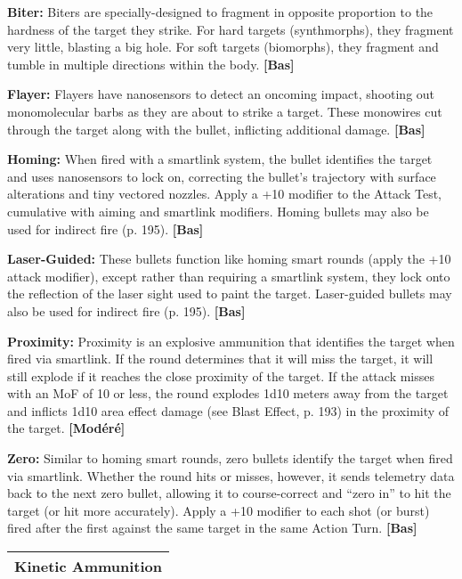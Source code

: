 {{\textbf{Biter:} Biters are specially-designed to fragment in opposite proportion to the hardness of the target they strike. For hard targets (synthmorphs), they fragment very little, blasting a big hole. For soft targets (biomorphs), they fragment and tumble in multiple directions within the body. \textbf{[Bas]} 

\textbf{Flayer:} Flayers have nanosensors to detect an oncoming impact, shooting out monomolecular barbs as they are about to strike a target. These monowires cut through the target along with the bullet, inflicting additional damage. \textbf{[Bas]} 

\textbf{Homing:} When fired with a smartlink system, the bullet identifies the target and uses nanosensors to lock on, correcting the bullet’s trajectory with surface alterations and tiny vectored nozzles. Apply a +10 modifier to the Attack Test, cumulative with aiming and smartlink modifiers. Homing bullets may also be used for indirect fire (p. 195). \textbf{[Bas]} 

\textbf{Laser-Guided:} These bullets function like homing smart rounds (apply the +10 attack modifier), except rather than requiring a smartlink system, they lock onto the reflection of the laser sight used to paint the target. Laser-guided bullets may also be used for indirect fire (p. 195). \textbf{[Bas]} 

\textbf{Proximity:} Proximity is an explosive ammunition that identifies the target when fired via smartlink. If the round determines that it will miss the target, it will still explode if it reaches the close proximity of the target. If the attack misses with an MoF of 10 or less, the round explodes 1d10 meters away from the target and inflicts 1d10 area effect damage (see Blast Effect, p. 193) in the proximity of the target. \textbf{[Modéré]} 

\textbf{Zero:} Similar to homing smart rounds, zero bullets identify the target when fired via smartlink. Whether the round hits or misses, however, it sends telemetry data back to the next zero bullet, allowing it to course-correct and ``zero in'' to hit the target (or hit more accurately). Apply a +10 modifier to each shot (or burst) fired after the first against the same target in the same Action Turn. \textbf{[Bas]} 

\begin{table} \begin{tabular}{|l|l|l|} \hline

\multicolumn{3}{|c|}{\textbf{Kinetic Ammunition}} \\ \hline


\end{tabular}
\end{table}}}

